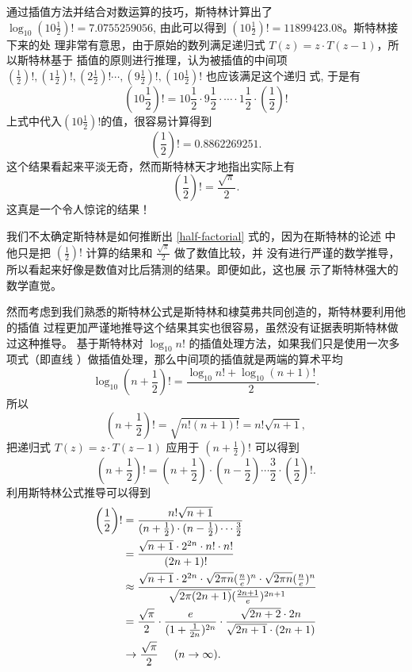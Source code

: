通过插值方法并结合对数运算的技巧，斯特林计算出了 $\log_{10} (10\frac{1}{2})!=
7.0755259056$, 由此可以得到 $(10\frac{1}{2})! = 11899423.08$。斯特林接下来的处
理非常有意思，由于原始的数列满足递归式 $T(z) = z \cdot T(z-1)$，所以斯特林基于
插值的原则进行推理，认为被插值的中间项 $(\frac{1}{2})!, (1\frac{1}{2})!,
(2\frac{1}{2})!  \cdots, (9\frac{1}{2})!, (10\frac{1}{2})!$ 也应该满足这个递归
式, 于是有 
$$ \left(10\frac{1}{2}\right)! = 10\frac{1}{2} \cdot
9\frac{1}{2} \cdot  \cdots \cdot  1\frac{1}{2} \cdot \left(\frac{1}{2}\right)! $$ 
上式中代入$(10\frac{1}{2})!$的值，很容易计算得到 
$$\left(\frac{1}{2}\right)! = 0.8862269251 .$$
这个结果看起来平淡无奇，然而斯特林天才地指出实际上有
\begin{equation}
\label{half-factorial}
\left(\frac{1}{2}\right)! = \frac{\sqrt\pi}{2} .
\end{equation}
这真是一个令人惊诧的结果！

我们不太确定斯特林是如何推断出 \eqref{half-factorial} 式的，因为在斯特林的论述
中他只是把 $(\frac{1}{2})!$ 计算的结果和 $\frac{\sqrt\pi}{2}$ 做了数值比较，并
没有进行严谨的数学推导，所以看起来好像是数值对比后猜测的结果。即便如此，这也展
示了斯特林强大的数学直觉。

然而考虑到我们熟悉的斯特林公式是斯特林和棣莫弗共同创造的，斯特林要利用他的插值
过程更加严谨地推导这个结果其实也很容易，虽然没有证据表明斯特林做过这种推导。
基于斯特林对 $\log_{10} n!$ 的插值处理方法，如果我们只是使用一次多项式（即直线
）做插值处理，那么中间项的插值就是两端的算术平均
$$ \log_{10} \left(n+\frac{1}{2}\right)! = \frac{\log_{10} n! + \log_{10} (n+1)!}{2} .$$
所以
$$ \left(n+\frac{1}{2}\right)! = \sqrt{n! (n+1)!} = n! \sqrt{n+1} ,$$
把递归式 $T(z) = z \cdot T(z-1)$ 应用于 $(n+\frac{1}{2})!$ 可以得到
$$ \left(n+\frac{1}{2}\right)! 
= (n+\frac{1}{2}) \cdot (n-\frac{1}{2}) \cdots \frac{3}{2} \cdot \left(\frac{1}{2}\right)! .$$
利用斯特林公式推导可以得到
\begin{align*}
\left(\frac{1}{2}\right)! & = \frac {n! \sqrt{n+1}} {(n+\frac{1}{2}) 
\cdot (n-\frac{1}{2}) \cdots \frac{3}{2}} \\
& = \frac {\sqrt{n+1} \cdot 2^{2n} \cdot n! \cdot n!} {(2n+1)!}  \\
& \displaystyle \approx \displaystyle \frac {\sqrt{n+1} \cdot 2^{2n}  
\cdot \sqrt{2\pi n} (\frac{n}{e})^n \cdot \sqrt{2\pi n} (\frac{n}{e})^n} 
{\sqrt{2\pi(2n+1)} (\frac{2n+1}{e})^{2n+1}} \\
& = \displaystyle \frac{\sqrt\pi}{2} \cdot \frac{e}{(1+\frac{1}{2n})^{2n}}  
\cdot \frac{\sqrt{2n+2}\cdot 2n}{\sqrt{2n+1}\cdot (2n+1)} \\
& \rightarrow \frac{\sqrt\pi}{2} \hspace{0.5cm} (n \rightarrow \infty) .
\end{align*}

